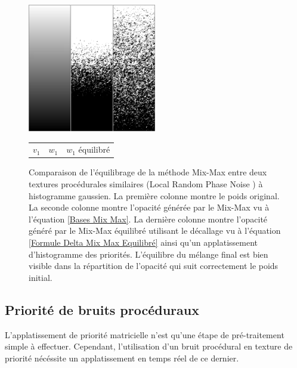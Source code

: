 \documentclass{article}
\begin{document}
\begin{figure}
    \centering
    \includegraphics[width=0.5\textwidth]{fig/Mix-Max/Priority W1.png}
    \\
    \begin{tabular}{
        >{\centering\arraybackslash}m{}
        >{\centering\arraybackslash}m{}
        >{\centering\arraybackslash}m{}
        }

        \footnotesize $v_1$               &
        \footnotesize $w_1$ \cite{mixmax} &
        \footnotesize $w_1$ équilibré
    \end{tabular}

    \caption{
        Comparaison de l'équilibrage de la méthode Mix-Max entre deux textures procédurales similaires (Local Random Phase Noise \cite{LRPN}) à histogramme gaussien. La première colonne montre le poids original. La seconde colonne montre l'opacité générée par le Mix-Max \cite{mixmax} vu à l'équation \ref{Bases Mix Max}. La dernière colonne montre l'opacité généré par le Mix-Max équilibré utilisant le décallage vu à l'équation \ref{Formule Delta Mix Max Equilibré} ainsi qu'un applatissement d'histogramme des priorités. L'équilibre du mélange final est bien visible dans la répartition de l'opacité qui suit correctement le poids initial.
    }
    \label{Résultats Priorités}
\end{figure}

\subsection{Priorité de bruits procéduraux}

L'applatissement de priorité matricielle n'est qu'une étape de pré-traitement
simple à effectuer. Cependant, l'utilisation d'un bruit procédural en texture
de priorité nécéssite un applatissement en temps réel de ce dernier.
\end{document}
